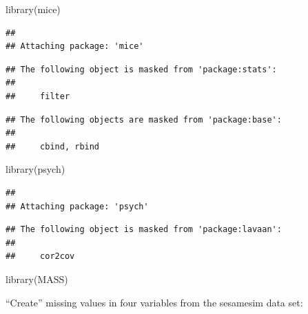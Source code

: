 \documentclass[
]{book}
\newenvironment{Shaded}{\begin{snugshade}}{\end{snugshade}}
\newcommand{\FunctionTok}[1]{\textcolor[rgb]{0.00,0.00,0.00}{#1}}
\newcommand{\NormalTok}[1]{#1}
\begin{document}
\begin{Shaded}
\begin{Highlighting}[]
\FunctionTok{library}\NormalTok{(mice)}
\end{Highlighting}
\end{Shaded}

\begin{verbatim}
## 
## Attaching package: 'mice'
\end{verbatim}

\begin{verbatim}
## The following object is masked from 'package:stats':
## 
##     filter
\end{verbatim}

\begin{verbatim}
## The following objects are masked from 'package:base':
## 
##     cbind, rbind
\end{verbatim}

\begin{Shaded}
\begin{Highlighting}[]
\FunctionTok{library}\NormalTok{(psych)}
\end{Highlighting}
\end{Shaded}

\begin{verbatim}
## 
## Attaching package: 'psych'
\end{verbatim}

\begin{verbatim}
## The following object is masked from 'package:lavaan':
## 
##     cor2cov
\end{verbatim}

\begin{Shaded}
\begin{Highlighting}[]
\FunctionTok{library}\NormalTok{(MASS)}
\end{Highlighting}
\end{Shaded}

``Create'' missing values in four variables from the sesamesim data set:
\end{document}
